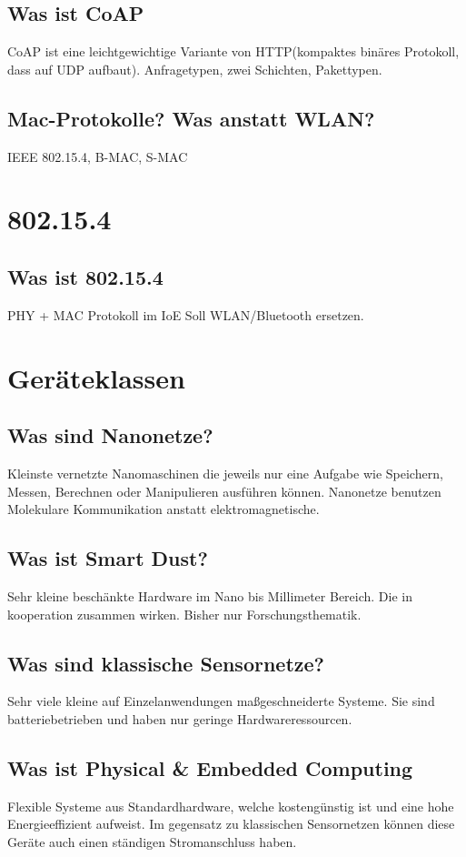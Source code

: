 	\subsection{Was ist CoAP}
	CoAP ist eine leichtgewichtige Variante von HTTP(kompaktes binäres Protokoll, dass auf UDP aufbaut).
	Anfragetypen, zwei Schichten, Pakettypen.
	
	\subsection{Mac-Protokolle? Was anstatt WLAN?}
	IEEE 802.15.4, B-MAC, S-MAC
	
\section{802.15.4}
	\subsection{Was ist 802.15.4}
	PHY + MAC Protokoll im IoE
	Soll WLAN/Bluetooth ersetzen.
	
\section{Geräteklassen}
	\subsection{Was sind Nanonetze?}
	Kleinste vernetzte Nanomaschinen die jeweils nur eine Aufgabe wie Speichern, Messen, Berechnen oder Manipulieren ausführen können. Nanonetze benutzen Molekulare Kommunikation anstatt elektromagnetische.
	
	\subsection{Was ist Smart Dust?}
	Sehr kleine beschänkte Hardware im Nano bis Millimeter Bereich. Die in kooperation zusammen wirken. Bisher nur Forschungsthematik. 
	
	\subsection{Was sind klassische Sensornetze?}
	Sehr viele kleine auf Einzelanwendungen maßgeschneiderte Systeme. Sie sind batteriebetrieben und haben nur geringe Hardwareressourcen.
	
	\subsection{Was ist Physical \& Embedded Computing}
	Flexible Systeme aus Standardhardware, welche kostengünstig ist und eine hohe Energieeffizient aufweist. Im gegensatz zu klassischen Sensornetzen können diese Geräte auch einen ständigen Stromanschluss haben.
	
